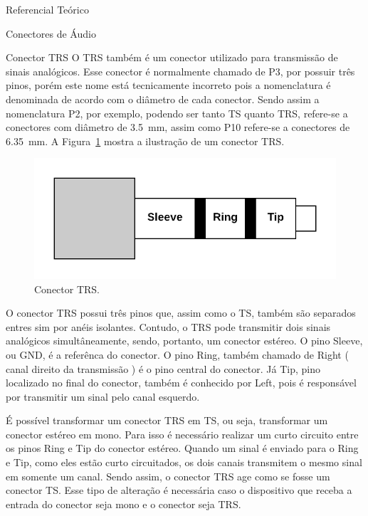 \begin{chapter}{Referencial Teórico}
\begin{section}{Conectores de Áudio}
\begin{subsection}{Conector TRS}
O TRS também é um conector utilizado para transmissão de sinais analógicos. Esse
conector é normalmente chamado de P3, por possuir três pinos, porém este nome
está tecnicamente incorreto pois a nomenclatura é denominada de acordo com o
diâmetro de cada conector. Sendo assim a nomenclatura P2, por exemplo, podendo
ser tanto TS quanto TRS,  refere-se a conectores com diâmetro de 3.5~mm, assim
como P10 refere-se a conectores de 6.35~mm. A Figura~\ref{fig:TRS} mostra a
ilustração de um conector TRS.

\begin{figure}[!h]
	\centering
	\begin{minipage}[c]{\textwidth}
	\centering
	\includegraphics[width=0.9\linewidth]{fig/trs}
	\caption{Conector TRS.}
	\label{fig:TRS}
	\end{minipage}
\end{figure} 

O conector TRS possui três pinos que, assim como o TS, também são separados 
entres sim por anéis isolantes. Contudo, o TRS pode transmitir dois sinais
analógicos simultâneamente, sendo, portanto, um conector estéreo. O pino Sleeve,
ou GND, é a referênca do conector. O pino Ring, também chamado de Right ( canal 
direito da transmissão ) é o  pino central do conector. Já Tip, pino localizado
no final do conector, também é conhecido por Left, pois é responsável por
transmitir um sinal pelo canal esquerdo.

É possível transformar um conector TRS em TS, ou seja, transformar um conector
estéreo em mono. Para isso é necessário realizar um curto circuito entre os
pinos Ring e Tip do conector estéreo. Quando um sinal é enviado para o Ring e
Tip, como eles estão curto circuitados, os dois canais transmitem o mesmo
sinal em somente um canal. Sendo assim, o conector TRS age como se fosse um
conector TS. Esse tipo de alteração é necessária caso o dispositivo que receba a
entrada do conector seja mono e o conector seja TRS. 

\end{subsection}

\end{section}
\end{chapter}
